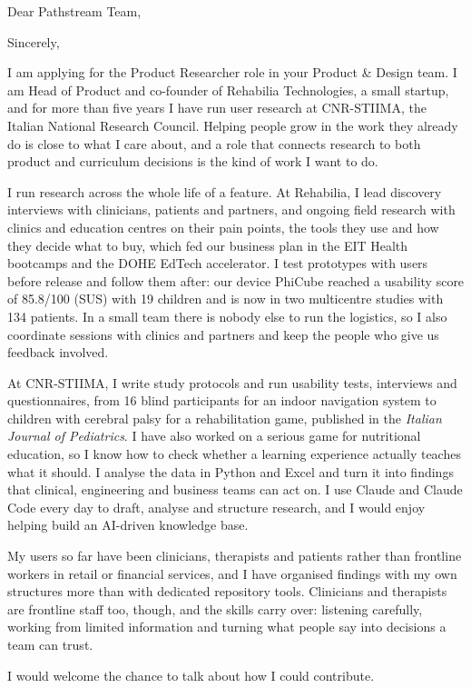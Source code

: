 \documentclass[11pt,a4paper,sans]{moderncv}
\begin{document}

\opening{Dear Pathstream Team,}
\closing{Sincerely,}
\makelettertitle

I am applying for the Product Researcher role in your Product \& Design team. I am Head of Product and co-founder of Rehabilia Technologies, a small startup, and for more than five years I have run user research at CNR-STIIMA, the Italian National Research Council. Helping people grow in the work they already do is close to what I care about, and a role that connects research to both product and curriculum decisions is the kind of work I want to do.

I run research across the whole life of a feature. At Rehabilia, I lead discovery interviews with clinicians, patients and partners, and ongoing field research with clinics and education centres on their pain points, the tools they use and how they decide what to buy, which fed our business plan in the EIT Health bootcamps and the DOHE EdTech accelerator. I test prototypes with users before release and follow them after: our device PhiCube reached a usability score of 85.8/100 (SUS) with 19 children and is now in two multicentre studies with 134 patients. In a small team there is nobody else to run the logistics, so I also coordinate sessions with clinics and partners and keep the people who give us feedback involved.

At CNR-STIIMA, I write study protocols and run usability tests, interviews and questionnaires, from 16 blind participants for an indoor navigation system to children with cerebral palsy for a rehabilitation game, published in the \textit{Italian Journal of Pediatrics}. I have also worked on a serious game for nutritional education, so I know how to check whether a learning experience actually teaches what it should. I analyse the data in Python and Excel and turn it into findings that clinical, engineering and business teams can act on. I use Claude and Claude Code every day to draft, analyse and structure research, and I would enjoy helping build an AI-driven knowledge base.

My users so far have been clinicians, therapists and patients rather than frontline workers in retail or financial services, and I have organised findings with my own structures more than with dedicated repository tools. Clinicians and therapists are frontline staff too, though, and the skills carry over: listening carefully, working from limited information and turning what people say into decisions a team can trust.

I would welcome the chance to talk about how I could contribute.

\makeletterclosing
\end{document}
